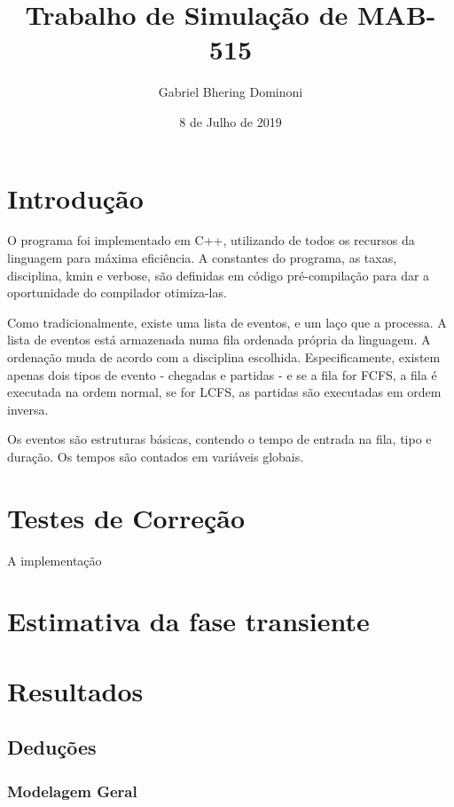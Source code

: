 \documentclass{article}
\title{Trabalho de Simulação de MAB-515}
\author{ Gabriel Bhering Dominoni }
\date{8 de Julho de 2019}
\begin{document}
\maketitle
\thispagestyle{empty}

\pagebreak

\tableofcontents

\pagebreak

\section{Introdução}
O programa foi implementado em C++, utilizando de todos os recursos da linguagem para máxima eficiência. A constantes do programa, as taxas, disciplina, kmin e verbose, são definidas em código pré-compilação para dar a oportunidade do compilador otimiza-las. 

Como tradicionalmente, existe uma lista de eventos, e um laço que a processa. A lista de eventos está armazenada numa fila ordenada própria da linguagem. A ordenação muda de acordo com a disciplina escolhida. Especificamente, existem apenas dois tipos de evento - chegadas e partidas - e se a fila for FCFS, a fila é executada na ordem normal, se for LCFS, as partidas são executadas em ordem inversa.

Os eventos são estruturas básicas, contendo o tempo de entrada na fila, tipo e duração. Os tempos são contados em variáveis globais.

\section{Testes de Correção}
A implementação 

\section{Estimativa da fase transiente}

\section{Resultados}

\subsection{Deduções}

\subsubsection{Modelagem Geral}
\end{document}
